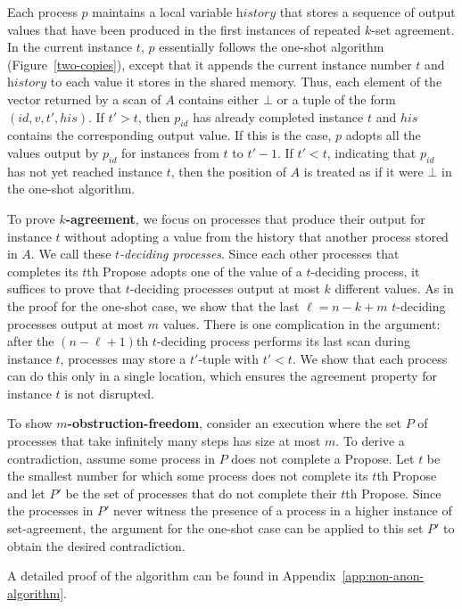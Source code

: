 \documentclass[11pt]{article}
\newcounter{ind}
\begin{document}
Each process $p$ maintains a local variable  $\textit{history}$ that
stores a sequence of output values that have been produced in the first
instances of repeated $k$-set agreement. 
In the current instance $t$, $p$ essentially follows the one-shot
algorithm (Figure~\ref{two-copies}), except that it appends the
current instance number $t$ and $\textit{history}$ to each value it
stores in the shared memory. 
Thus, each element of the vector returned by a scan of $A$
contains either $\bot$ or a tuple of the form
$(id,v,t',his)$.  
If $t'>t$, then $p_{id}$ has already completed instance
$t$ and  $his$ contains the corresponding output value.
If this is the case, $p$ adopts all the values output by $p_{id}$ for
instances from $t$ to $t'-1$.      
If $t'<t$, indicating that $p_{id}$ has not yet reached instance $t$, 
then the position of $A$ is treated as if it were $\bot$ in the
one-shot algorithm.   


To prove {\bf $k$-agreement}, we focus on processes that produce
their output for instance $t$ without adopting a value from the history
that another process stored in $A$.  We call these \emph{$t$-deciding processes}.
Since each other processes that completes its $t$th {\sc Propose} adopts
one of the value of a $t$-deciding process, it suffices to prove that
$t$-deciding processes output at most $k$ different values.
As in the proof for the one-shot case, we show that the last $\ell=n-k+m$ 
$t$-deciding processes output at most $m$ values.
There is one complication in the argument:
after the $(n-\ell+1)$th $t$-deciding process performs its last scan during
instance $t$, processes may store 
a $t'$-tuple with $t'<t$.
We show that each process can do this only in a single location, 
which ensures 
the agreement property for instance $t$ is not disrupted.
    
To show {\bf $m$-obstruction-freedom}, 
consider an execution where the set $P$ of processes that take infinitely many
steps has size at most $m$.
To derive a contradiction, assume some process in $P$ does not complete a {\sc Propose}.  Let $t$ be the smallest number for which some process does not complete its $t$th {\sc Propose} and let $P'$ be the set of processes that do not complete
their $t$th {\sc Propose}.  Since the processes in $P'$ never witness 
the presence of a process in a higher instance of set-agreement,
the argument for the one-shot case can be applied to this set $P'$
to obtain the desired contradiction.

A detailed proof of the algorithm can be found in Appendix~\ref{app:non-anon-algorithm}.
\end{document}

